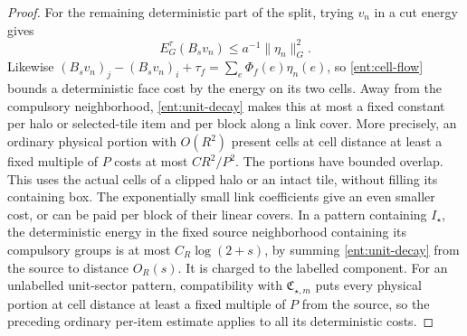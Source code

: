 \begin{proof}
For the remaining deterministic part of the split, trying \(v_n\)
in a cut energy gives
\[
 E_G^\tau(B_sv_n)\le a^{-1}\|\eta_n\|_G^2.
\]
Likewise
\((B_sv_n)_j-(B_sv_n)_i+\tau_f=\sum_e\Phi_f(e)\eta_n(e)\),
so \eqref{ent:cell-flow} bounds a deterministic face cost
by the energy on its two cells.  Away from the compulsory
neighborhood, \eqref{ent:unit-decay} makes this at most a
fixed constant per halo or selected-tile item and per block along a
link cover.  More precisely, an ordinary physical portion with \(O(R^2)\)
present cells at cell distance at least a fixed multiple
of \(P\) costs at most \(CR^2/P^2\).  The portions have
bounded overlap.  This uses the actual cells of a clipped halo or
an intact tile, without filling its containing box.
The exponentially small link coefficients give an even
smaller cost, or can be paid per block of their linear
covers.  In a pattern containing \(I_\star\), the deterministic energy
in the fixed source neighborhood containing its compulsory groups is at most
\(C_R\log(2+s)\), by summing \eqref{ent:unit-decay} from the source
to distance \(O_R(s)\).  It is charged to the labelled component.
For an unlabelled unit-sector pattern, compatibility with
\(\mathfrak C_{\star,m}\) puts every physical portion at cell distance
at least a fixed multiple of \(P\) from the source, so the preceding
ordinary per-item estimate applies to all its deterministic costs.


\end{proof}
